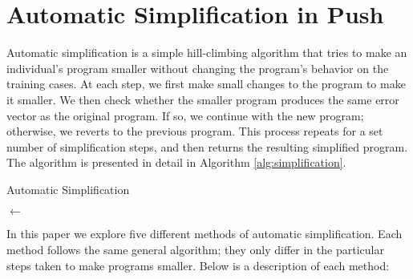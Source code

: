 

\section{Automatic Simplification in Push}
\label{sec:simplification}

Automatic simplification is a simple hill-climbing algorithm that tries to make an individual's program smaller without changing the program's behavior on the training cases. At each step, we first make small changes to the program to make it smaller. We then check whether the smaller program produces the same error vector as the original program. If so, we continue with the new program; otherwise, we reverts to the previous program. This process repeats for a set number of simplification steps, and then returns the resulting simplified program. The algorithm is presented in detail in Algorithm \ref{alg:simplification}.

\begin{algorithm}[ht]
\caption{Automatic Simplification}
\label{alg:simplification}


\BlankLine

\ErrorVector $\leftarrow$ \ComputeErrors{\Ind} \;
\Return \Ind
\end{algorithm}

In this paper we explore five different methods of automatic simplification. Each method follows the same general algorithm; they only differ in the particular steps taken to make programs smaller. %
Below is a description of each method:

